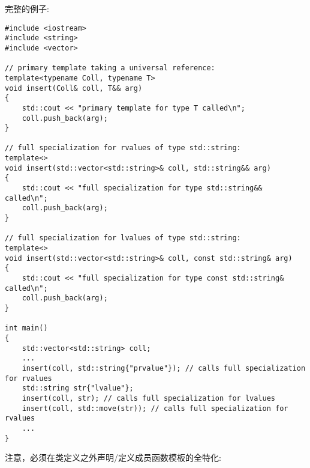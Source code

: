 完整的例子:\par

{\color{red}{generic/universalspec.cpp}}\par

\begin{lstlisting}[caption={}]
#include <iostream>
#include <string>
#include <vector>

// primary template taking a universal reference:
template<typename Coll, typename T>
void insert(Coll& coll, T&& arg)
{
	std::cout << "primary template for type T called\n";
	coll.push_back(arg);
}

// full specialization for rvalues of type std::string:
template<>
void insert(std::vector<std::string>& coll, std::string&& arg)
{
	std::cout << "full specialization for type std::string&& called\n";
	coll.push_back(arg);
}

// full specialization for lvalues of type std::string:
template<>
void insert(std::vector<std::string>& coll, const std::string& arg)
{
	std::cout << "full specialization for type const std::string& called\n";
	coll.push_back(arg);
}

int main()
{
	std::vector<std::string> coll;
	...
	insert(coll, std::string{"prvalue"}); // calls full specialization for rvalues
	std::string str{"lvalue"};
	insert(coll, str); // calls full specialization for lvalues
	insert(coll, std::move(str)); // calls full specialization for rvalues
	...
}
\end{lstlisting}

注意，必须在类定义之外声明/定义成员函数模板的全特化:\par

